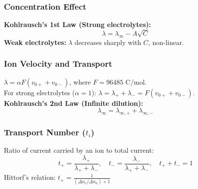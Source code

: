 \subsubsection{Concentration Effect}
\textbf{Kohlrausch's 1st Law (Strong electrolytes):}
\begin{equation}
    \lambda = \lambda_\infty - A \sqrt{C}
\end{equation}
\textbf{Weak electrolytes:} $\lambda$ decreases sharply with $C$, non-linear.

\subsubsection{Ion Velocity and Transport}
$\lambda = \alpha F (v_{0+} + v_{0-})$, where $F = 96485$ C/mol. \\
For strong electrolytes ($\alpha=1$): $\lambda = \lambda_+ + \lambda_- = F(v_{0+} + v_{0-})$. \\
\textbf{Kohlrausch's 2nd Law (Infinite dilution):}
\begin{equation}
    \lambda_\infty = \lambda_{\infty, +} + \lambda_{\infty, -}
\end{equation}

\subsubsection{Transport Number ($t_i$)}
Ratio of current carried by an ion to total current:
\begin{equation}
    t_+ = \frac{\lambda_+}{\lambda_+ + \lambda_-}, \quad t_- = \frac{\lambda_-}{\lambda_+ + \lambda_-}, \quad t_+ + t_- = 1
\end{equation}
Hittorf's relation: $t_+ = \frac{1}{(\Delta n_c / \Delta n_a) + 1}$